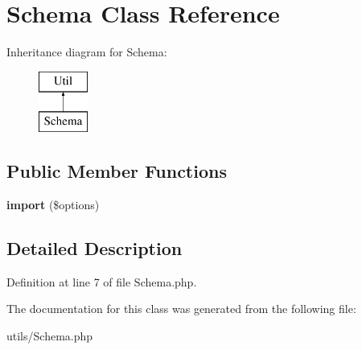 \hypertarget{class_schema}{
\section{Schema Class Reference}
\label{class_schema}
}
Inheritance diagram for Schema:\begin{figure}[H]
\begin{center}
\leavevmode
\includegraphics[height=2.000000cm]{class_schema}
\end{center}
\end{figure}
\subsection*{Public Member Functions}
\begin{DoxyCompactItemize}
\item 
\hypertarget{class_schema_a8ea20dece61eee8333bcfea79d063715}{
{\bfseries import} (\$options)}
\label{class_schema_a8ea20dece61eee8333bcfea79d063715}

\end{DoxyCompactItemize}


\subsection{Detailed Description}


Definition at line 7 of file Schema.php.



The documentation for this class was generated from the following file:\begin{DoxyCompactItemize}
\item 
utils/Schema.php\end{DoxyCompactItemize}
